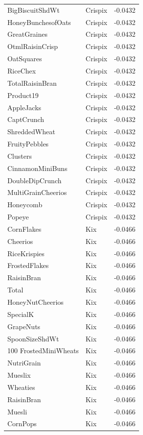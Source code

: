 \begin{longtable}{llr}
BigBiscuitShdWt & Crispix & -0.0432 \\
HoneyBunchesofOats & Crispix & -0.0432 \\
GreatGraines & Crispix & -0.0432 \\
OtmlRaisinCrisp & Crispix & -0.0432 \\
OatSquares & Crispix & -0.0432 \\
RiceChex & Crispix & -0.0432 \\
TotalRaisinBran & Crispix & -0.0432 \\
Product19 & Crispix & -0.0432 \\
AppleJacks & Crispix & -0.0432 \\
CaptCrunch & Crispix & -0.0432 \\
ShreddedWheat & Crispix & -0.0432 \\
FruityPebbles & Crispix & -0.0432 \\
Clusters & Crispix & -0.0432 \\
CinnamonMiniBuns & Crispix & -0.0432 \\
DoubleDipCrunch & Crispix & -0.0432 \\
MultiGrainCheerios & Crispix & -0.0432 \\
Honeycomb & Crispix & -0.0432 \\
Popeye & Crispix & -0.0432 \\
CornFlakes & Kix & -0.0466 \\
Cheerios & Kix & -0.0466 \\
RiceKrispies & Kix & -0.0466 \\
FrostedFlakes & Kix & -0.0466 \\
RaisinBran & Kix & -0.0466 \\
Total & Kix & -0.0466 \\
HoneyNutCheerios & Kix & -0.0466 \\
SpecialK & Kix & -0.0466 \\
GrapeNuts & Kix & -0.0466 \\
SpoonSizeShdWt & Kix & -0.0466 \\
100%
FrostedMiniWheats & Kix & -0.0466 \\
NutriGrain & Kix & -0.0466 \\
Mueslix & Kix & -0.0466 \\
Wheaties & Kix & -0.0466 \\
RaisinBran & Kix & -0.0466 \\
Muesli & Kix & -0.0466 \\
CornPops & Kix & -0.0466 \\

\end{longtable}
